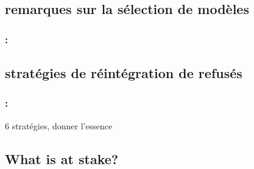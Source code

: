 \documentclass[english,xcolor={rgb,dvipsnames,table,usenames}]{beamer}
\begin{document}
\subsection{remarques sur la sélection de modèles}

\begin{frame}
\frametitle{\secname : \subsecname}


\end{frame}



\subsection{stratégies de réintégration de refusés}

\begin{frame}
\frametitle{\secname : \subsecname}

6 stratégies, donner l'essence

\end{frame}


\subsection{What is at stake?}
\end{document}
